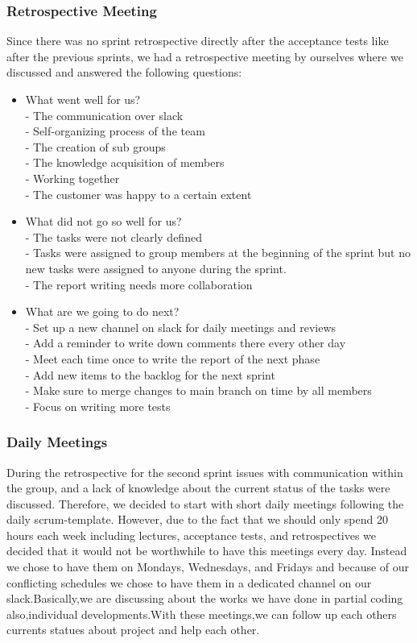 \documentclass[14]{article}
\begin{document}
\subsubsection{Retrospective Meeting}
Since there was no sprint retrospective directly after the acceptance tests like after the previous sprints, we had a retrospective meeting by ourselves where we discussed and answered the following questions:
\begin{itemize}
\item What went well for us? \\
- The communication over slack \\ 
- Self-organizing process of the team \\
- The creation of sub groups \\
- The knowledge acquisition of members \\
- Working together \\
- The customer was happy to a certain extent 
\item What did not go so well for us? \\
- The tasks were not clearly defined \\
- Tasks were assigned to group members at the beginning of the sprint but no new tasks were assigned to anyone during the sprint.\\
- The report writing needs more collaboration 
\item What are we going to do next? \\
- Set up a new channel on slack for daily meetings and reviews \\
- Add a reminder to write down comments there every other day \\
- Meet each time once to write the report of the next phase \\
- Add new items to the backlog for the next sprint \\
- Make sure to merge changes to main branch on time by all members \\
- Focus on writing more tests 
\end{itemize}


\subsubsection{Daily Meetings}
During the retrospective for the second sprint issues with communication within the group, and a lack of knowledge about the current status of the tasks were discussed. Therefore, we decided to start with short daily meetings following the daily scrum-template. However, due to the fact that we should only spend 20 hours each week including lectures, acceptance tests, and retrospectives we decided that it would not be worthwhile to have this meetings every day. Instead we chose to have them on Mondays, Wednesdays, and Fridays and because of our conflicting schedules we chose to have them in a dedicated channel on our slack.Basically,we are discussing about the works we have done in partial coding also,individual developments.With these meetings,we can follow up each others currents statues about project and help each other.
\end{document}
